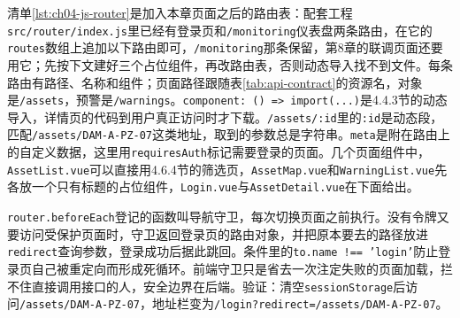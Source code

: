 清单\ref{lst:ch04-js-router}是加入本章页面之后的路由表：配套工程\texttt{src/router/index.js}里已经有登录页和\texttt{/monitoring}仪表盘两条路由，在它的\texttt{routes}数组上追加以下路由即可，\texttt{/monitoring}那条保留，第8章的联调页面还要用它；先按下文建好三个占位组件，再改路由表，否则动态导入找不到文件。每条路由有路径、名称和组件；页面路径跟随表\ref{tab:api-contract}的资源名，对象是\texttt{/assets}，预警是\texttt{/warnings}。\texttt{component: () => import(...)}是4.4.3节的动态导入，详情页的代码到用户真正访问时才下载。\texttt{/assets/:id}里的\texttt{:id}是动态段，匹配\texttt{/assets/DAM-A-PZ-07}这类地址，取到的参数总是字符串。\texttt{meta}是附在路由上的自定义数据，这里用\texttt{requiresAuth}标记需要登录的页面。几个页面组件中，\texttt{AssetList.vue}可以直接用4.6.4节的筛选页，\texttt{AssetMap.vue}和\texttt{WarningList.vue}先各放一个只有标题的占位组件，\texttt{Login.vue}与\texttt{AssetDetail.vue}在下面给出。

\texttt{router.beforeEach}登记的函数叫导航守卫，每次切换页面之前执行。没有令牌又要访问受保护页面时，守卫返回登录页的路由对象，并把原本要去的路径放进\texttt{redirect}查询参数，登录成功后据此跳回。条件里的\texttt{to.name !== 'login'}防止登录页自己被重定向而形成死循环。前端守卫只是省去一次注定失败的页面加载，拦不住直接调用接口的人，安全边界在后端。验证：清空\texttt{sessionStorage}后访问\texttt{/assets/DAM-A-PZ-07}，地址栏变为\texttt{/login?redirect=/assets/DAM-A-PZ-07}。

